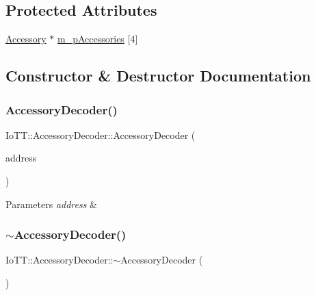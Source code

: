 \subsection*{Protected Attributes}
\begin{DoxyCompactItemize}
\item 
\hyperlink{classIoTT_1_1Accessory}{Accessory} $\ast$ \hyperlink{classIoTT_1_1AccessoryDecoder_ac8008ef7c48ab2aa422b893d7fc2fd5b}{m\+\_\+p\+Accessories} \mbox{[}4\mbox{]}
\end{DoxyCompactItemize}


\subsection{Constructor \& Destructor Documentation}
\mbox{\label{classIoTT_1_1AccessoryDecoder_a5bc073b3c436232fc2b5679b6e5f0a25}} 
\subsubsection{\texorpdfstring{Accessory\+Decoder()}{AccessoryDecoder()}}
{\footnotesize\ttfamily Io\+T\+T\+::\+Accessory\+Decoder\+::\+Accessory\+Decoder (\begin{DoxyParamCaption}\item[{const \hyperlink{namespaceIoTT_a31b8cd9473fc447b3fb341b78afa54fe}{D\+C\+C\+Address\+\_\+t} \&}]{address }\end{DoxyParamCaption})}


\begin{DoxyParams}{Parameters}
{\em address} & \\
\hline
\end{DoxyParams}
\mbox{\label{classIoTT_1_1AccessoryDecoder_ae0b1401a67215ab04b0ab5d8d57f1ad2}} 
\subsubsection{\texorpdfstring{$\sim$\+Accessory\+Decoder()}{~AccessoryDecoder()}}
{\footnotesize\ttfamily Io\+T\+T\+::\+Accessory\+Decoder\+::$\sim$\+Accessory\+Decoder (\begin{DoxyParamCaption}{ }\end{DoxyParamCaption})\hspace{0.3cm}{\ttfamily [virtual]}}




